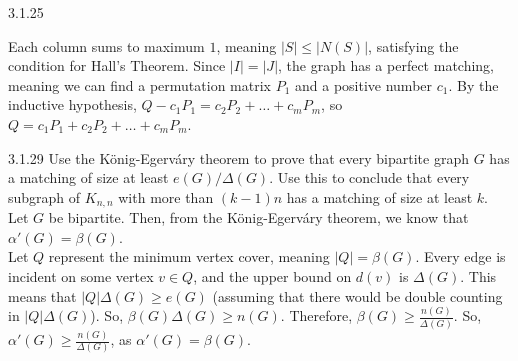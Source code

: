 \documentclass[10pt]{extarticle}
\begin{document}
{\begin{problem}{3.1.25}
\begin{description}[font = \normalfont\scshape]
        Each column sums to maximum $1$, meaning $|S| \leq |N(S)|$, satisfying the condition for Hall's Theorem. Since $|I| = |J|$, the graph has a perfect matching, meaning we can find a permutation matrix $P_1$ and a positive number $c_1$. By the inductive hypothesis, $Q - c_1P_1 = c_2P_2+\dots+c_mP_m$, so $Q = c_1P_1 + c_2P_2 + \dots + c_mP_m$.
    \end{description}
  \end{problem}
  \begin{problem}{3.1.29}
    Use the König-Egerváry theorem to prove that every bipartite graph $G$ has a matching of size at least $e(G)/\Delta(G)$. Use this to conclude that every subgraph of $K_{n,n}$ with more than $(k-1)n$ has a matching of size at least $k$.
    \tcblower
    Let $G$ be bipartite. Then, from the König-Egerváry theorem, we know that $\alpha'(G) = \beta(G)$.\\

    Let $Q$ represent the minimum vertex cover, meaning $|Q| = \beta(G)$. Every edge is incident on some vertex $v\in Q$, and the upper bound on $d(v)$ is $\Delta(G)$. This means that $|Q|\Delta(G) \geq e(G)$ (assuming that there would be double counting in $|Q|\Delta(G)$). So, $\beta(G)\Delta(G) \geq n(G)$. Therefore, $\beta(G) \geq \frac{n(G)}{\Delta(G)}$. So, $\alpha'(G) \geq \frac{n(G)}{\Delta(G)}$, as $\alpha'(G) = \beta(G)$.
  \end{problem}
}
\end{document}
